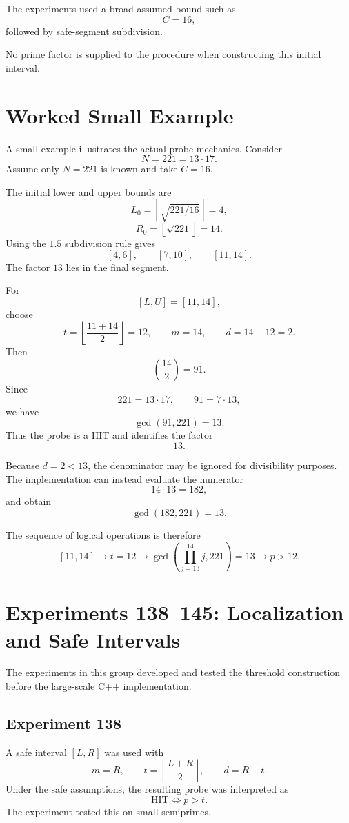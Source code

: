 \documentclass[11pt,a4paper]{article}
\begin{document}
The experiments used a broad assumed bound such as
\[
C=16,
\]
followed by safe-segment subdivision.

No prime factor is supplied to the procedure when constructing this initial interval.

\section{Worked Small Example}

A small example illustrates the actual probe mechanics. Consider
\[
N=221=13\cdot17.
\]
Assume only $N=221$ is known and take $C=16$.

The initial lower and upper bounds are
\[
L_0
=
\left\lceil\sqrt{221/16}\right\rceil
=4,
\]
\[
R_0
=
\left\lfloor\sqrt{221}\right\rfloor
=14.
\]
Using the $1.5$ subdivision rule gives
\[
[4,6],
\qquad
[7,10],
\qquad
[11,14].
\]
The factor $13$ lies in the final segment.

For
\[
[L,U]=[11,14],
\]
choose
\[
t=\left\lfloor\frac{11+14}{2}\right\rfloor=12,
\qquad
m=14,
\qquad
d=14-12=2.
\]
Then
\[
\binom{14}{2}=91.
\]
Since
\[
221=13\cdot17,
\qquad
91=7\cdot13,
\]
we have
\[
\gcd(91,221)=13.
\]
Thus the probe is a HIT and identifies the factor
\[
\boxed{13}.
\]

Because $d=2<13$, the denominator may be ignored for divisibility purposes. The implementation can instead evaluate the numerator
\[
14\cdot13=182,
\]
and obtain
\[
\gcd(182,221)=13.
\]

The sequence of logical operations is therefore
\[
[11,14]
\longrightarrow
t=12
\longrightarrow
\gcd\!\left(\prod_{j=13}^{14}j,221\right)=13
\longrightarrow
p>12.
\]

\section{Experiments 138--145: Localization and Safe Intervals}

The experiments in this group developed and tested the threshold construction before the large-scale C++ implementation.

\subsection{Experiment 138}

A safe interval $[L,R]$ was used with
\[
m=R,
\qquad
t=\left\lfloor\frac{L+R}{2}\right\rfloor,
\qquad
d=R-t.
\]
Under the safe assumptions, the resulting probe was interpreted as
\[
\text{HIT}\iff p>t.
\]
The experiment tested this on small semiprimes.
\end{document}
